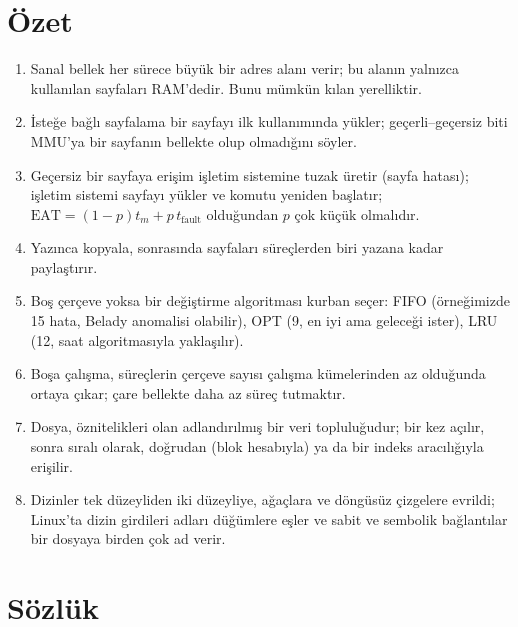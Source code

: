\section{Özet}

\begin{keyidea}
\begin{enumerate}[leftmargin=1.4em]
  \item Sanal bellek her sürece büyük bir adres alanı verir; bu alanın yalnızca kullanılan sayfaları RAM'dedir. Bunu mümkün kılan yerelliktir.
  \item İsteğe bağlı sayfalama bir sayfayı ilk kullanımında yükler; geçerli--geçersiz biti MMU'ya bir sayfanın bellekte olup olmadığını söyler.
  \item Geçersiz bir sayfaya erişim işletim sistemine tuzak üretir (sayfa hatası); işletim sistemi sayfayı yükler ve komutu yeniden başlatır; $\text{EAT} = (1-p)t_m + p\,t_{\text{fault}}$ olduğundan $p$ çok küçük olmalıdır.
  \item Yazınca kopyala,  sonrasında sayfaları süreçlerden biri yazana kadar paylaştırır.
  \item Boş çerçeve yoksa bir değiştirme algoritması kurban seçer: FIFO (örneğimizde 15 hata, Belady anomalisi olabilir), OPT (9, en iyi ama geleceği ister), LRU (12, saat algoritmasıyla yaklaşılır).
  \item Boşa çalışma, süreçlerin çerçeve sayısı çalışma kümelerinden az olduğunda ortaya çıkar; çare bellekte daha az süreç tutmaktır.
  \item Dosya, öznitelikleri olan adlandırılmış bir veri topluluğudur; bir kez açılır, sonra sıralı olarak, doğrudan (blok hesabıyla) ya da bir indeks aracılığıyla erişilir.
  \item Dizinler tek düzeyliden iki düzeyliye, ağaçlara ve döngüsüz çizgelere evrildi; Linux'ta dizin girdileri adları düğümlere eşler ve sabit ve sembolik bağlantılar bir dosyaya birden çok ad verir.
\end{enumerate}
\end{keyidea}

\section{Sözlük}

